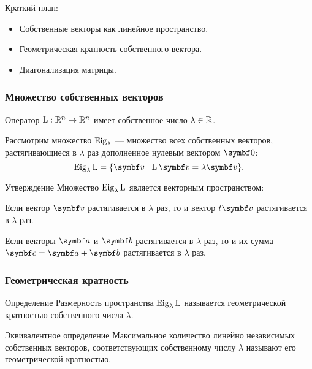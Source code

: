 
\begin{frame} %


\end{frame}



\begin{frame}{Краткий план:}
  \begin{itemize}[<+->]
    \item Собственные векторы как линейное пространство. 
    \item Геометрическая кратность собственного вектора.
    \item Диагонализация матрицы.
  \end{itemize}

\end{frame}


\begin{frame}
    \frametitle{Множество собственных векторов}

    Оператор $\operatorname{L} :\mathbb{R}^n \to \mathbb{R}^n$ имеет собственное число $\lambda \in \mathbb{R}$.
    
    Рассмотрим множество $\operatorname{Eig}_\lambda$ — множество всех собственных векторов, растягивающиеся 
    в $\lambda$ раз дополненное нулевым вектором $\bzero$:
    \[
        \eig_\lambda \LL = \{ \bv \mid \LL \bv = \lambda \bv \}.
    \]

    \pause

    \begin{block}{Утверждение}
        Множество $\operatorname{Eig}_{\lambda} \operatorname{L}$ является векторным пространством:
        \pause

        Если вектор $\bv$ растягивается в $\lambda$ раз, то и вектор $t \bv$ растягивается в $\lambda$ раз.
        \pause

       Если векторы $\ba$ и $\bb$ растягивается в $\lambda$ раз, 
       то и их сумма $\bc = \ba + \bb$ растягивается в $\lambda$ раз.
    \end{block}

    

\end{frame}


\begin{frame}
    \frametitle{Геометрическая кратность}

    \begin{block}{Определение}
        Размерность пространства $\operatorname{Eig}_\lambda \operatorname{L}$ называется
        \alert{геометрической кратностью} собственного числа $\lambda$.        
    \end{block}

    \pause
    \begin{block}{Эквивалентное определение}
        Максимальное количество линейно независимых собственных векторов,
        соответствующих собственному числу $\lambda$ называют его 
        \alert{геометрической кратностью}.        
    \end{block}

\end{frame}


